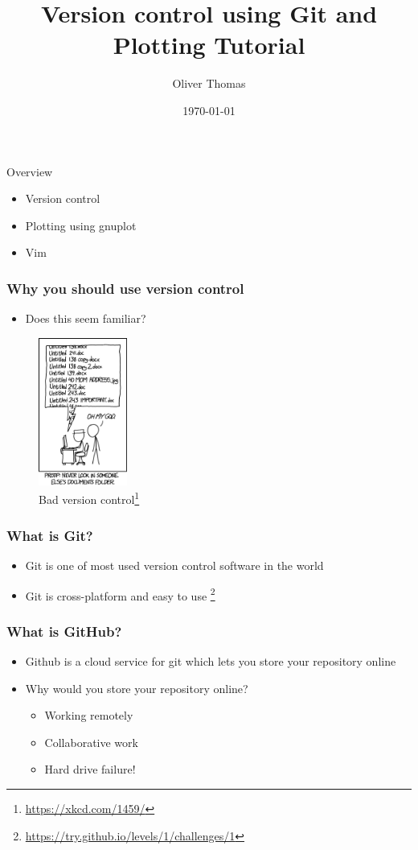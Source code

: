 \documentclass{beamer}
\title{Version control using Git and Plotting Tutorial}
\author{Oliver Thomas}
\institute{Quantum Engineering CDT \\ University of Bristol}
\date{\today}
\begin{document}
\frame{\titlepage}



\begin{frame}{Overview}


\begin{itemize}
        \item Version control
        \item Plotting using gnuplot
        \item Vim
    \end{itemize}
\end{frame}

\begin{frame}
\frametitle{Why you should use version control}
\begin{itemize}
	\item Does this seem familiar? 
\end{itemize}

\begin{figure}[H]
	\centering
	\includegraphics[width=0.26\textwidth]{xkcdversion.png}
	\caption{Bad version control\footnote{\url{https://xkcd.com/1459/}}}
	\label{fig:xkcdversion}
\end{figure}
\end{frame}

\begin{frame}
\frametitle{What is Git?}
\begin{itemize}
\item Git is one of most used version control software in the world 
\item Git is cross-platform and easy to use \footnote{\url{https://try.github.io/levels/1/challenges/1}}
\end{itemize}
\end{frame}

\begin{frame}
\frametitle{What is GitHub?}
\begin{itemize} 
\item Github is a cloud service for git which lets you store your repository online
\item Why would you store your repository online?
\begin{itemize}
\item Working remotely
\item Collaborative work  
\item Hard drive failure!
\end{itemize}
\end{itemize}
\end{frame}
\end{document}
